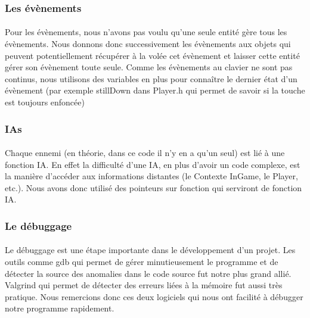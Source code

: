 \subsubsection{Les évènements}

\paragraph{} Pour les évènements, nous n'avons pas voulu qu'une seule entité gère tous les évènements. Nous donnons donc successivement les évènements aux objets qui peuvent potentiellement récupérer à la volée cet évènement et laisser cette entité gérer son évènement toute seule. Comme les évènements au clavier ne sont pas continus, nous utilisons des variables en plus pour connaître le dernier état d'un évènement (par exemple stillDown dans Player.h qui permet de savoir si la touche est toujours enfoncée)

\subsubsection{IAs}

\paragraph{} Chaque ennemi (en théorie, dans ce code il n'y en a qu'un seul) est lié à une fonction IA. En effet la difficulté d'une IA, en plus d'avoir un code complexe, est la manière d'accéder aux informations distantes (le Contexte InGame, le Player, etc.). Nous avons donc utilisé des pointeurs sur fonction qui serviront de fonction IA.

\subsubsection{Le débuggage}

\paragraph{} Le débuggage est une étape importante dans le développement d'un projet. Les outils comme gdb qui permet de gérer minutieusement le programme et de détecter la source des anomalies dans le code source fut notre plus grand allié. Valgrind qui permet de détecter des erreurs liées à la mémoire fut aussi très pratique. Nous remercions donc ces deux logiciels qui nous ont facilité à débugger notre programme rapidement.
